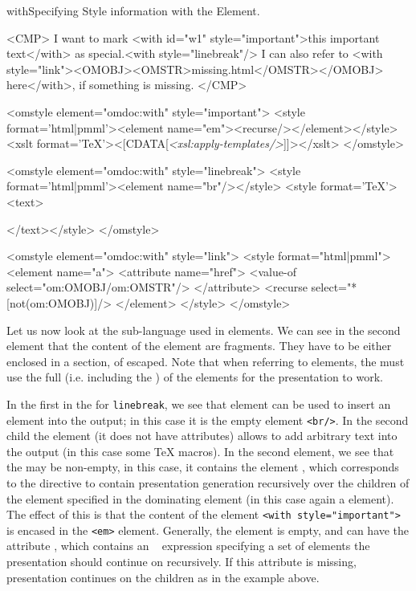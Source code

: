 \begin{myfig}{with}{Specifying Style information with the {}
    Element.}\footnotesize
\begin{boxedverbatim}
<CMP>
  I want to mark <with id="w1" style="important">this important
  text</with> as special.<with style="linebreak"/>
  I can also refer to 
  <with style="link"><OMOBJ><OMSTR>missing.html</OMSTR></OMOBJ>
   here</with>, if something is missing.
</CMP>

<omstyle element="omdoc:with" style="important">
  <style format='html|pmml'><element name="em"><recurse/></element></style>
  <xslt format='TeX'><[CDATA[{\em<xsl:apply-templates/>}]]></xslt>
</omstyle>

<omstyle element="omdoc:with" style="linebreak">
  <style format='html|pmml'><element name="br"/></style>
  <style format='TeX'><text>\par\noindent</text></style>
</omstyle>

<omstyle element="omdoc:with" style="link">
 <style format="html|pmml">
  <element name="a">
   <attribute name="href">
    <value-of select="om:OMOBJ/om:OMSTR"/>
   </attribute>
   <recurse select="*[not(om:OMOBJ)]/>
  </element>
 </style>
</omstyle>
\end{boxedverbatim}
\end{myfig}
Let us now look at the sub-language used in {} elements.  We can
see in the second {} element that the content of the
{} element are {\xslt} fragments. They have to be either enclosed in
a {} section, of escaped. Note that when referring to {\omdoc}
elements, the {\xslt} must use the full {} (i.e. including the {}) of the
elements for the presentation to work.

In the first {} in the {} for {\tt{linebreak}}, we
see that {} element can be used to insert an {\xml} element into
the output; in this case it is the empty {\html} element {\tt{<br/>}}. In the
second {} child the {} element (it does not have
attributes) allows to add arbitrary text into the output (in this case some {\TeX}
macros). In the second {} element, we see that the
{} may be non-empty, in this case, it contains the element
{}, which corresponds to the directive to contain presentation
generation recursively over the children of the element specified in the
dominating {} element (in this case again a {}
element). The effect of this is that the content of the element {\tt{<with
    style="important">}} is encased in the {\html} {\tt{<em>}} element. Generally,
the {} element is empty, and can have the attribute
{}, which contains an {\xpath}~\cite{ClaDeR:xpath99}
expression specifying a set of {\omdoc} elements the presentation should continue
on recursively. If this attribute is missing, presentation continues on the
children as in the example above.

